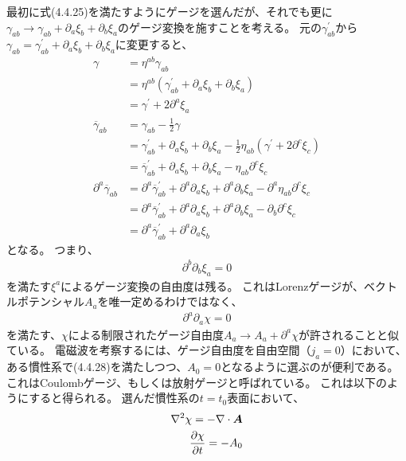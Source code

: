 \documentclass[a4paper]{jsarticle}
\def\vec#1{\mbox{\boldmath $#1$}}
\newcommand{\pdif}[2]{\frac{\partial #1}{\partial #2}}
\begin{document}
最初に式(4.4.25)を満たすようにゲージを選んだが、それでも更に$\gamma_{ab} \to \gamma_{ab} + \partial_a \xi_b + \partial_b \xi_a$のゲージ変換を施すことを考える。
元の$\gamma^{\prime}_{ab}$から$\gamma_{ab} = \gamma^{\prime}_{ab} + \partial_a \xi_b + \partial_b \xi_a$に変更すると、
\begin{align}
	\gamma &= \eta^{ab} \gamma_{ab} \\
	&= \eta^{ab} \left( \gamma^{\prime}_{ab} + \partial_a \xi_b + \partial_b \xi_a \right) \\
	&= \gamma^{\prime} + 2\partial^a \xi_a \label{eq:gamma} \\
	\overline{\gamma}_{ab} &= \gamma_{ab} - \frac{1}{2} \gamma \\
	&= \gamma^{\prime}_{ab} + \partial_a \xi_b + \partial_b \xi_a - \frac{1}{2} \eta_{ab} \left( \gamma^{\prime} + 2\partial^c \xi_c \right) \\
	&= \overline{\gamma}^{\prime}_{ab} + \partial_a \xi_b + \partial_b \xi_a - \eta_{ab} \partial^c \xi_c \label{eq:gammaBar} \\
	\partial^a \overline{\gamma}_{ab} &= \partial^a \overline{\gamma}^{\prime}_{ab} + \partial^a \partial_a \xi_b + \partial^a \partial_b \xi_a - \partial^a \eta_{ab} \partial^c \xi_c \\
	&= \partial^a \overline{\gamma}^{\prime}_{ab} + \partial^a \partial_a \xi_b + \partial^a \partial_b \xi_a - \partial_b \partial^c \xi_c \\
	&= \partial^a \overline{\gamma}^{\prime}_{ab} + \partial^a \partial_a \xi_b \label{eq:pgamma}
\end{align}
となる。
つまり、
\begin{align}
	\partial^b \partial_b \xi_a = 0 \tag{4.4.27}
\end{align}
を満たす$\xi^a$によるゲージ変換の自由度は残る。
これはLorenzゲージが、ベクトルポテンシャル$A_a$を唯一定めるわけではなく、
\begin{align}
	\partial^a \partial_a \chi = 0 \tag{4.4.28}
\end{align}
を満たす、$\chi$による制限されたゲージ自由度$A_a \to A_a + \partial^a \chi$が許されることと似ている。
電磁波を考察するには、ゲージ自由度を自由空間（$j_a = 0$）において、ある慣性系で(4.4.28)を満たしつつ、$A_0 = 0$となるように選ぶのが便利である。
これはCoulombゲージ、もしくは放射ゲージと呼ばれている。
これは以下のようにすると得られる。
選んだ慣性系の$t=t_0$表面において、
\begin{align}
	\nabla^2 \chi = - \nabla \cdot \vec{A} \\
	\pdif{\chi}{t} = -A_0
\end{align}
\end{document}

